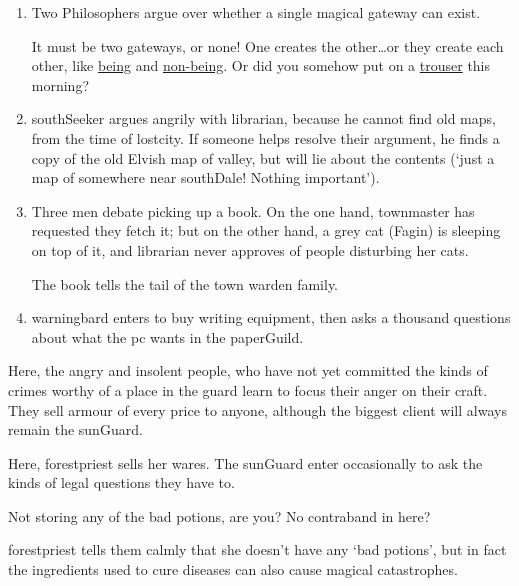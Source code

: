 \begin{multicols}{2}
\begin{enumerate}
  \item
  Two Philosophers argue over whether a single magical gateway can exist.
  \begin{speechtext}
    It must be two gateways, or none!
    One creates the other\ldots or they create each other, like \underline{being} and \underline{non-being}.
    Or did you somehow put on a \underline{trouser} this morning?
  \end{speechtext}
  \item
  \Gls{southSeeker} argues angrily with \gls{librarian}, because he cannot find old maps, from the time of \gls{lostcity}.
  If someone helps resolve their argument, he finds a copy of the old Elvish map of \gls{valley}, but will lie about the contents (`just a map of somewhere near \gls{southDale}! Nothing important').
  \item
  Three men debate picking up a book.
  On the one hand, \gls{townmaster} has requested they fetch it; but on the other hand, a grey cat (Fagin) is sleeping on top of it, and \gls{librarian} never approves of people disturbing her cats.

  The book tells the tail of the \gls{town} \gls{warden} family.
  \item
  \Gls{warningbard} enters to buy writing equipment, then asks a thousand questions about what the \gls{pc} wants in the \gls{paperGuild}.
\end{enumerate}


Here, the angry and insolent people, who have not yet committed the kinds of crimes worthy of a place in the \gls{guard} learn to focus their anger on their craft.
They sell armour of every price to anyone, although the biggest client will always remain the \gls{sunGuard}.


Here, \gls{forestpriest} sells her wares.
The \gls{sunGuard} enter occasionally to ask the kinds of legal questions they have to.

\begin{speechtext}
  Not storing any of the bad potions, are you?
  No contraband in here?
\end{speechtext}

\Gls{forestpriest} tells them calmly that she doesn't have any `bad potions', but in fact the \glspl{ingredient} used to cure diseases can also cause magical catastrophes.


\end{multicols}
